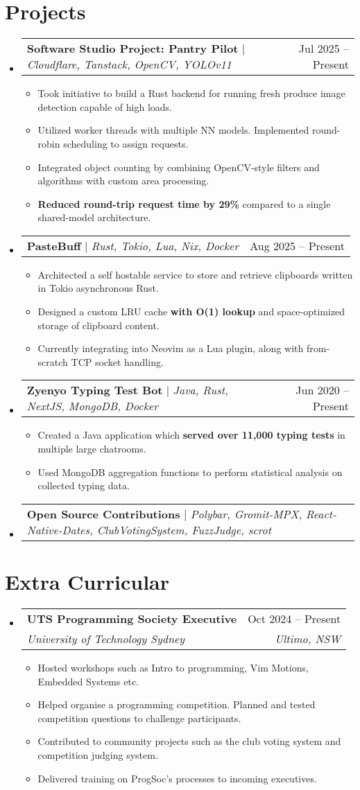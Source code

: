 \documentclass[letterpaper,11pt]{article}
\makeatletter
\newcommand{\resumeItem}[1]{
  \item\small{
    {#1 \vspace{-2pt}}
  }
}
\newcommand{\resumeSubheading}[4]{
  \vspace{-2pt}\item
    \begin{tabular*}{0.97\textwidth}[t]{l@{\extracolsep{\fill}}r}
      \textbf{#1} & #2 \\
      \textit{\small#3} & \textit{\small #4} \\
    \end{tabular*}\vspace{-7pt}
}
\newcommand{\resumeProjectHeading}[2]{
    \item
    \begin{tabular*}{0.97\textwidth}{l@{\extracolsep{\fill}}r}
      \small#1 & #2 \\
    \end{tabular*}\vspace{-7pt}
}
\newcommand{\resumeSubHeadingListStart}{\begin{itemize}[leftmargin=0.15in, label={}]}
\newcommand{\resumeSubHeadingListEnd}{\end{itemize}}
\newcommand{\resumeItemListStart}{\begin{itemize}}
\newcommand{\resumeItemListEnd}{\end{itemize}\vspace{-5pt}}
\makeatother
\begin{document}
\section{Projects}
    \resumeSubHeadingListStart
      \resumeProjectHeading
          {\textbf{Software Studio Project: Pantry Pilot} $|$ \emph{Cloudflare, Tanstack, OpenCV, YOLOv11}}{Jul 2025 -- Present}
          \resumeItemListStart
            \resumeItem{Took initiative to build a Rust backend for running fresh produce image detection capable of high loads.}
            \resumeItem{Utilized worker threads with multiple NN models. Implemented round-robin scheduling to assign requests.}
            \resumeItem{Integrated object counting by combining OpenCV-style filters and algorithms with custom area processing.}
            \resumeItem{\textbf{Reduced round-trip request time by 29\%} compared to a single shared-model architecture.}
          \resumeItemListEnd
      \resumeProjectHeading
          {\textbf{PasteBuff} $|$ \emph{Rust, Tokio, Lua, Nix, Docker}}{Aug 2025 -- Present}
          \resumeItemListStart
            \resumeItem{Architected a self hostable service to store and retrieve clipboards written in Tokio asynchronous Rust.}
            \resumeItem{Designed a custom LRU cache \textbf{with O(1) lookup} and space-optimized storage of clipboard content.}
            \resumeItem{Currently integrating into Neovim as a Lua plugin, along with from-scratch TCP socket handling.}
          \resumeItemListEnd
      \resumeProjectHeading
          {\textbf{Zyenyo Typing Test Bot} $|$ \emph{Java, Rust, NextJS, MongoDB, Docker}}{Jun 2020 -- Present}
          \resumeItemListStart
            \resumeItem{Created a Java application which \textbf{served over 11,000 typing tests} in multiple large chatrooms.}
            \resumeItem{Used MongoDB aggregation functions to perform statistical analysis on collected typing data.}
          \resumeItemListEnd
      \resumeProjectHeading
          {\textbf{Open Source Contributions} $|$ \emph{Polybar, Gromit-MPX, React-Native-Dates, ClubVotingSystem, FuzzJudge, scrot}}{}
    \resumeSubHeadingListEnd


\section{Extra Curricular}
    \resumeSubHeadingListStart
    \resumeSubheading
      {UTS Programming Society Executive}{Oct 2024 -- Present}
      {University of Technology Sydney}{Ultimo, NSW}
      \resumeItemListStart
        \resumeItem{Hosted workshops such as Intro to programming, Vim Motions, Embedded Systems etc.}
        \resumeItem{Helped organise a programming competition. Planned and tested competition questions to challenge participants.}
        \resumeItem{Contributed to community projects such as the club voting system and competition judging system.}
        \resumeItem{Delivered training on ProgSoc’s processes to incoming executives.}
      \resumeItemListEnd
    \resumeSubHeadingListEnd
\end{document}
